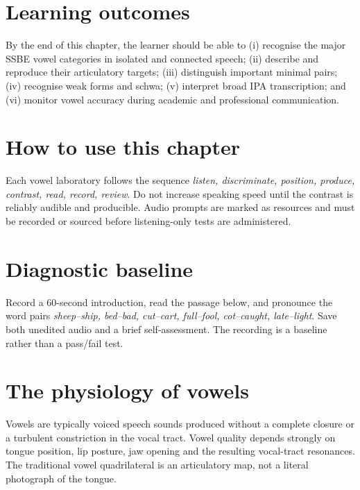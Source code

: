 \section{Learning outcomes}
By the end of this chapter, the learner should be able to (i) recognise the major SSBE vowel categories in isolated and connected speech; (ii) describe and reproduce their articulatory targets; (iii) distinguish important minimal pairs; (iv) recognise weak forms and schwa; (v) interpret broad IPA transcription; and (vi) monitor vowel accuracy during academic and professional communication.
\section{How to use this chapter}
Each vowel laboratory follows the sequence \emph{listen, discriminate, position, produce, contrast, read, record, review}. Do not increase speaking speed until the contrast is reliably audible and producible. Audio prompts are marked as resources and must be recorded or sourced before listening-only tests are administered.
\section{Diagnostic baseline}
Record a 60-second introduction, read the passage below, and pronounce the word pairs \emph{sheep--ship, bed--bad, cut--cart, full--fool, cot--caught, late--light}. Save both unedited audio and a brief self-assessment. The recording is a baseline rather than a pass/fail test.
\section{The physiology of vowels}
Vowels are typically voiced speech sounds produced without a complete closure or a turbulent constriction in the vocal tract. Vowel quality depends strongly on tongue position, lip posture, jaw opening and the resulting vocal-tract resonances. The traditional vowel quadrilateral is an articulatory map, not a literal photograph of the tongue.
